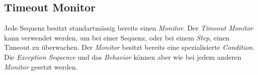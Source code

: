 \subsection{Timeout Monitor}
Jede Sequenz besitzt standartmässig bereits einen \textit{Monitor}.
Der \textit{Timeout Monitor} kann verwendet werden, um bei einer Sequenz, oder bei einem \textit{Step}, einen Timeout zu überwachen.
Der \textit{Monitor} besitzt bereits eine spezialisierte \textit{Condition}.
Die \textit{Exception Sequence} und das \textit{Behavior} können aber wie bei jedem anderen \textit{Monitor} gesetzt werden.





